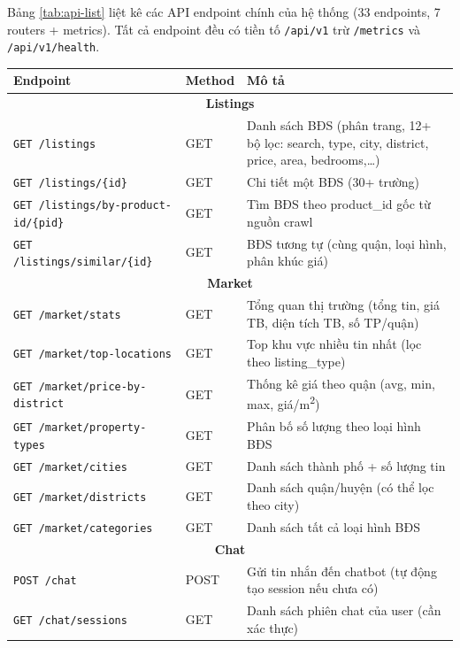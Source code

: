 Bảng \ref{tab:api-list} liệt kê các API endpoint chính của hệ thống (33 endpoints, 7 routers + metrics). Tất cả endpoint đều có tiền tố \texttt{/api/v1} trừ \texttt{/metrics} và \texttt{/api/v1/health}.

{\footnotesize
\begin{longtable}{|p{5.2cm}|p{1.2cm}|p{9.3cm}|}
    \hline
    \textbf{Endpoint} & \textbf{Method} & \textbf{Mô tả} \\
    \hline
    \multicolumn{3}{|c|}{\textbf{Listings}} \\
    \hline
    \texttt{GET /listings} & GET & Danh sách BĐS (phân trang, 12+ bộ lọc: search, type, city, district, price, area, bedrooms,\dots) \\
    \hline
    \texttt{GET /listings/\{id\}} & GET & Chi tiết một BĐS (30+ trường) \\
    \hline
    \texttt{GET /listings/by-product-id/\{pid\}} & GET & Tìm BĐS theo product\_id gốc từ nguồn crawl \\
    \hline
    \texttt{GET /listings/similar/\{id\}} & GET & BĐS tương tự (cùng quận, loại hình, phân khúc giá) \\
    \hline
    \multicolumn{3}{|c|}{\textbf{Market}} \\
    \hline
    \texttt{GET /market/stats} & GET & Tổng quan thị trường (tổng tin, giá TB, diện tích TB, số TP/quận) \\
    \hline
    \texttt{GET /market/top-locations} & GET & Top khu vực nhiều tin nhất (lọc theo listing\_type) \\
    \hline
    \texttt{GET /market/price-by-district} & GET & Thống kê giá theo quận (avg, min, max, giá/m\textsuperscript{2}) \\
    \hline
    \texttt{GET /market/property-types} & GET & Phân bố số lượng theo loại hình BĐS \\
    \hline
    \texttt{GET /market/cities} & GET & Danh sách thành phố + số lượng tin \\
    \hline
    \texttt{GET /market/districts} & GET & Danh sách quận/huyện (có thể lọc theo city) \\
    \hline
    \texttt{GET /market/categories} & GET & Danh sách tất cả loại hình BĐS \\
    \hline
    \multicolumn{3}{|c|}{\textbf{Chat}} \\
    \hline
    \texttt{POST /chat} & POST & Gửi tin nhắn đến chatbot (tự động tạo session nếu chưa có) \\
    \hline
    \texttt{GET /chat/sessions} & GET & Danh sách phiên chat của user (cần xác thực) \\

\end{longtable}}
